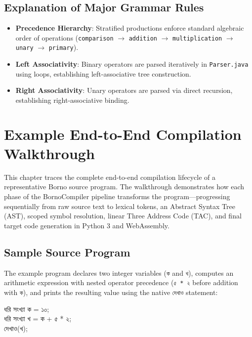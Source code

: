 \documentclass[12pt, a4paper]{report}
\begin{document}
\section{Explanation of Major Grammar Rules}
\begin{itemize}
    \item \textbf{Precedence Hierarchy}: Stratified productions enforce standard algebraic order of operations (\texttt{comparison} $\rightarrow$ \texttt{addition} $\rightarrow$ \texttt{multiplication} $\rightarrow$ \texttt{unary} $\rightarrow$ \texttt{primary}).
    \item \textbf{Left Associativity}: Binary operators are parsed iteratively in \texttt{Parser.java} using loops, establishing left-associative tree construction.
    \item \textbf{Right Associativity}: Unary operators are parsed via direct recursion, establishing right-associative binding.
\end{itemize}

\chapter{Example End-to-End Compilation Walkthrough}

This chapter traces the complete end-to-end compilation lifecycle of a representative Borno source program. The walkthrough demonstrates how each phase of the BornoCompiler pipeline transforms the program—progressing sequentially from raw source text to lexical tokens, an Abstract Syntax Tree (AST), scoped symbol resolution, linear Three Address Code (TAC), and final target code generation in Python 3 and WebAssembly.

\section*{Sample Source Program}
The example program declares two integer variables (\texttt{ক} and \texttt{খ}), computes an arithmetic expression with nested operator precedence (\texttt{৫ * ২} before addition with \texttt{ক}), and prints the resulting value using the native \texttt{দেখাও} statement:

\begin{tcolorbox}[colback=codegray,colframe=black!20,arc=0mm,boxrule=0.5pt,left=10pt,right=10pt,top=6pt,bottom=6pt]
\ttfamily\small
ধরি সংখ্যা ক = ১০;\\
ধরি সংখ্যা খ = ক + ৫ * ২;\\
দেখাও(খ);
\end{tcolorbox}
\end{document}
